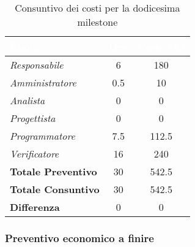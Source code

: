 \begin{table}[H]
    \renewcommand\arraystretch{1.5}
    \centering
    \begin{tabular}{|l|c|c|}
    \hline
    \rowcolor[HTML]{036400}
    \textcolor{white}{\textbf{Ruolo}} & \multicolumn{1}{l|}{\textcolor{white}{\textbf{Ore}}} & \multicolumn{1}{l|}{\textcolor{white}{\textbf{Costo (€)}}} \\ \hline
    \rowcolor[HTML]{EFEFEF}\textit{Responsabile}      & 6           & 180            \\ \hline
    \rowcolor[HTML]{C0C0C0}\textit{Amministratore}    & 0.5         & 10              \\ \hline
    \rowcolor[HTML]{EFEFEF}\textit{Analista}          & 0           & 0               \\ \hline
    \rowcolor[HTML]{C0C0C0}\textit{Progettista}       & 0           & 0           \\ \hline
    \rowcolor[HTML]{EFEFEF}\textit{Programmatore}     & 7.5         & 112.5        \\ \hline
    \rowcolor[HTML]{C0C0C0}\textit{Verificatore}      & 16          & 240          \\ \hline
    \rowcolor[HTML]{EFEFEF}\textbf{Totale Preventivo} & 30          & 542.5          \\ \hline
    \rowcolor[HTML]{C0C0C0}\textbf{Totale Consuntivo} & 30          & 542.5            \\ \hline
    \rowcolor[HTML]{EFEFEF}\textbf{Differenza}        & 0           & 0            \\ \hline
    \end{tabular}
    \caption{Consuntivo dei costi per la dodicesima milestone}
\end{table}

\subsubsection{Preventivo economico a finire}

